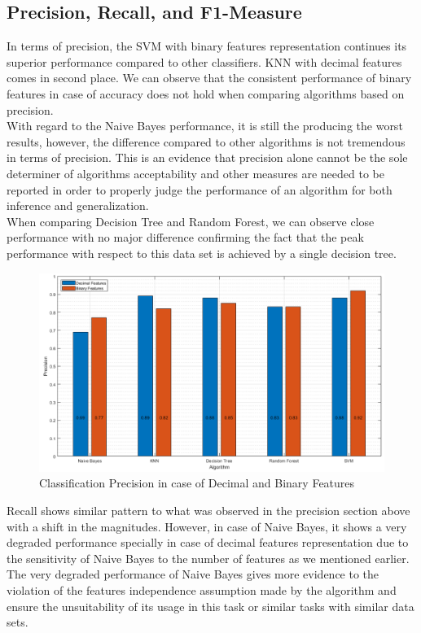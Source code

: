 \documentclass{article}
\begin{document}
\subsection{Precision, Recall, and F1-Measure}
In terms of precision, the SVM with binary features representation continues its superior performance compared to other classifiers. KNN with decimal features comes in second place. We can observe that the consistent performance of binary features in case of accuracy does not hold when comparing algorithms based on precision. \\
\indent With regard to the Naive Bayes performance, it is still the producing the worst results, however, the difference compared to other algorithms is not tremendous in terms of precision. This is an evidence that precision alone cannot be the sole determiner of algorithms acceptability and other measures are needed to be reported in order to properly judge the performance of an algorithm for both inference and generalization. \\
\indent When comparing Decision Tree and Random Forest, we can observe close performance with no major difference confirming the fact that the peak performance with respect to this data set is achieved by a single decision tree. 
\begin{figure}[H]
\centering
\includegraphics[width=\textwidth]{../Figures/precision.png}
\caption{Classification Precision in case of Decimal and Binary Features}
\end{figure}

Recall shows similar pattern to what was observed in the precision section above with a shift in the magnitudes. However, in case of Naive Bayes, it shows a very degraded performance specially in case of decimal features representation due to the sensitivity of Naive Bayes to the number of features as we mentioned earlier. The very degraded performance of Naive Bayes gives more evidence to the violation of the features independence assumption made by the algorithm and ensure the unsuitability of its usage in this task or similar tasks with similar data sets. \\
\end{document}
